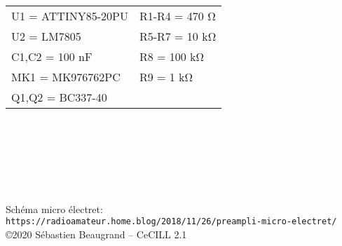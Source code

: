\documentclass{kicad}
\begin{document}
\begin{center}
~\\
~\\
\\
~\\
~\\
\begin{tabular}{ll}
U1 = ATTINY85-20PU & R1-R4 = 470 \si{\ohm}\\
U2 = LM7805 & R5-R7 = 10 \si{\kilo\ohm}\\
C1,C2 = 100 \si{\nano\farad} & R8 = 100 \si{\kilo\ohm}\\
MK1 = MK976762PC & R9 = 1 \si{\kilo\ohm}\\
Q1,Q2 = BC337-40\\
\end{tabular}
\\
~\\
\\
~\\
~\\
~\\
Schéma micro électret:
\texttt{\small https://radioamateur.home.blog/2018/11/26/preampli-micro-electret/}\\
\vfill
\scriptsize
\copyright 2020 Sébastien Beaugrand -- CeCILL 2.1
\end{center}
\end{document}
